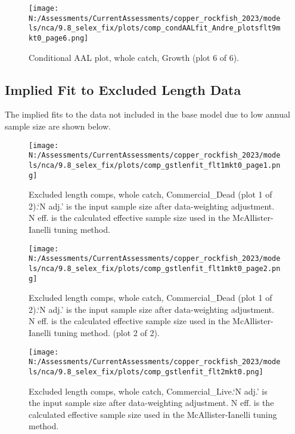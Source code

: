 \documentclass[11pt,
  english,
  letterpaper,
]{article}
\begin{document}
\begin{figure}
\centering
\texttt{[image: N:/Assessments/CurrentAssessments/copper\_rockfish\_2023/models/nca/9.8\_selex\_fix/plots/comp\_condAALfit\_Andre\_plotsflt9mkt0\_page6.png]}
\caption{Conditional AAL plot, whole catch, Growth (plot 6 of 6).\label{fig:comp_condAALfit_Andre_plotsflt9mkt0_page6}}
\end{figure}

\hypertarget{excluded-data}{%
\subsection{Implied Fit to Excluded Length Data}\label{excluded-data}}

The implied fits to the data not included in the base model due to low annual sample size are shown below.

\begin{figure}
\centering
\texttt{[image: N:/Assessments/CurrentAssessments/copper\_rockfish\_2023/models/nca/9.8\_selex\_fix/plots/comp\_gstlenfit\_flt1mkt0\_page1.png]}
\caption{Excluded length comps, whole catch, Commercial\_Dead (plot 1 of 2).`N adj.' is the input sample size after data-weighting adjustment. N eff. is the calculated effective sample size used in the McAllister-Ianelli tuning method.\label{fig:comp_gstlenfit_flt1mkt0_page1}}
\end{figure}

\begin{figure}
\centering
\texttt{[image: N:/Assessments/CurrentAssessments/copper\_rockfish\_2023/models/nca/9.8\_selex\_fix/plots/comp\_gstlenfit\_flt1mkt0\_page2.png]}
\caption{Excluded length comps, whole catch, Commercial\_Dead (plot 1 of 2).`N adj.' is the input sample size after data-weighting adjustment. N eff. is the calculated effective sample size used in the McAllister-Ianelli tuning method. (plot 2 of 2).\label{fig:comp_gstlenfit_flt1mkt0_page2}}
\end{figure}

\begin{figure}
\centering
\texttt{[image: N:/Assessments/CurrentAssessments/copper\_rockfish\_2023/models/nca/9.8\_selex\_fix/plots/comp\_gstlenfit\_flt2mkt0.png]}
\caption{Excluded length comps, whole catch, Commercial\_Live.`N adj.' is the input sample size after data-weighting adjustment. N eff. is the calculated effective sample size used in the McAllister-Ianelli tuning method.\label{fig:comp_gstlenfit_flt2mkt0}}
\end{figure}
\end{document}
